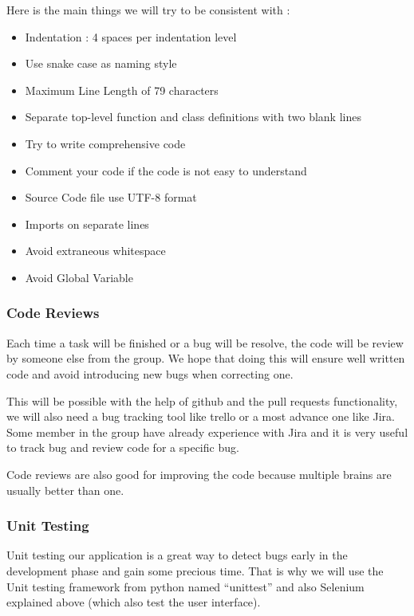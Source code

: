 \documentclass[11pt, a4paper]{article}   	%
\begin{document}
Here is the main things we will try to be consistent with : 

\begin{itemize}
\item Indentation : 4 spaces per indentation level
\item Use snake case as naming style
\item Maximum Line Length of 79 characters
\item Separate top-level function and class definitions with two blank lines
\item Try to write comprehensive code
\item Comment your code if the code is not easy to understand
\item Source Code file use UTF-8 format
\item Imports on separate lines
\item Avoid extraneous whitespace
\item Avoid Global Variable
\end{itemize} 


\subsubsection{Code Reviews}
	
Each time a task will be finished or a bug will be resolve, the code will be review by someone else from the group. 
We hope that doing this will ensure well written code and avoid introducing new bugs when correcting one.  
 
This will be possible with the help of github and the pull requests functionality, we will also need a bug tracking tool like trello or a most advance one like Jira. Some member in the group have already experience with Jira and it is very useful to track bug and review code for a specific bug. 
 
Code reviews are also good for improving the code because multiple brains are usually better than one. 
 
\subsubsection{Unit Testing} 
 
Unit testing our application is a great way to detect bugs early in the development phase and gain some precious time. That is why we will use the Unit testing framework from python named \enquote{unittest} and also Selenium explained above (which also test the user interface). 
 
\end{document}
